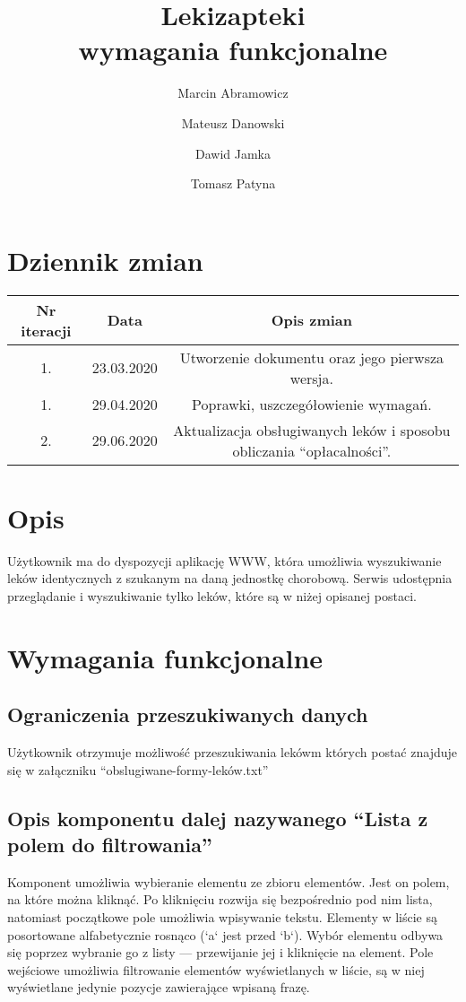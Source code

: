 \documentclass{article}
\title{
Lekizapteki\\
\large wymagania funkcjonalne}
\author{Marcin Abramowicz \and Mateusz Danowski \and Dawid Jamka \and Tomasz Patyna}
\begin{document}
  \setlength{\parindent}{0in}
  \maketitle

  \section{Dziennik zmian}
  \begin{tabular}{|c|c|c|}
    Nr iteracji & Data & Opis zmian \\
    \hline
    1. & 23.03.2020 & Utworzenie dokumentu oraz jego pierwsza wersja. \\
    \hline
    1. & 29.04.2020 & Poprawki, uszczegółowienie wymagań. \\
    \hline
    2. & 29.06.2020 & Aktualizacja obsługiwanych leków i sposobu obliczania ``opłacalności''.
  \end{tabular}

  \section{Opis}
    Użytkownik ma do dyspozycji aplikację WWW, która umożliwia wyszukiwanie leków identycznych z szukanym na daną jednostkę chorobową.
    Serwis udostępnia przeglądanie i wyszukiwanie tylko leków, które są w niżej opisanej postaci.

  \section{Wymagania funkcjonalne}
    \subsection{Ograniczenia przeszukiwanych danych}
      Użytkownik otrzymuje możliwość przeszukiwania lekówm których postać znajduje się w załączniku ``obslugiwane-formy-leków.txt''

    \subsection{Opis komponentu dalej nazywanego ``Lista z polem do filtrowania''}
      Komponent umożliwia wybieranie elementu ze zbioru elementów.
      Jest on polem, na które można kliknąć.
      Po kliknięciu rozwija się bezpośrednio pod nim lista, natomiast początkowe pole umożliwia wpisywanie tekstu.
      Elementy w liście są posortowane alfabetycznie rosnąco (`a` jest przed `b`).
      Wybór elementu odbywa się poprzez wybranie go z listy — przewijanie jej i kliknięcie na element.
      Pole wejściowe umożliwia filtrowanie elementów wyświetlanych w liście, są w niej wyświetlane jedynie pozycje zawierające wpisaną frazę.
\end{document}

